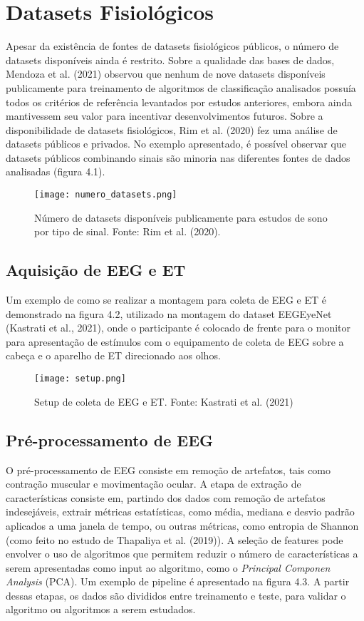\chapter{Datasets Fisiológicos}


Apesar da existência de fontes de datasets fisiológicos públicos, 
o número de datasets disponíveis ainda é restrito. Sobre a qualidade das bases de dados, 
Mendoza et al. (2021) observou que nenhum de nove datasets disponíveis publicamente para 
treinamento de algoritmos de classificação analisados possuía 
todos os critérios de referência levantados por estudos anteriores, embora ainda mantivessem seu valor
para incentivar desenvolvimentos futuros.
Sobre a disponibilidade de datasets fisiológicos,
Rim et al. (2020) fez uma análise de datasets públicos e privados. 
No exemplo apresentado, 
é possível observar que datasets públicos combinando sinais são minoria nas diferentes fontes de dados analisadas
(figura 4.1).
\begin{figure}[!h]
      \centering
      \texttt{[image: numero\_datasets.png]}
      \caption{Número de datasets disponíveis publicamente para estudos de sono por tipo de sinal. Fonte: Rim et al. (2020). }
\end{figure}

\section{Aquisição de EEG e ET}

Um exemplo de como se realizar a montagem para coleta de EEG e ET é demonstrado na figura 4.2, 
utilizado na montagem do dataset EEGEyeNet (Kastrati et al., 2021),
onde o participante é colocado de frente para o monitor para apresentação de estímulos com o 
equipamento de coleta de EEG sobre a cabeça e o aparelho de ET direcionado aos olhos. 


\begin{figure}[h]
      \centering
      \texttt{[image: setup.png]}
      \caption{Setup de coleta de EEG e ET. Fonte: Kastrati et al. (2021)}
\end{figure}



\section{Pré-processamento de EEG}
O pré-processamento de EEG consiste em remoção de artefatos, 
tais como contração muscular e movimentação ocular.
A etapa de extração de características consiste em, partindo dos dados com 
remoção de artefatos indesejáveis, extrair métricas estatísticas, como média, 
mediana e desvio padrão aplicados a uma janela de tempo, ou outras métricas, como entropia de Shannon 
(como feito no estudo de Thapaliya et al. (2019)). A seleção de features pode 
envolver o uso de algoritmos que permitem reduzir o número de características a 
serem apresentadas como input ao algoritmo, como o \textit{Principal Componen Analysis} (PCA).
 Um exemplo de pipeline é apresentado na figura 4.3. A partir dessas etapas, os dados são divididos entre treinamento e 
 teste, para validar o algoritmo ou algoritmos a serem estudados. 

